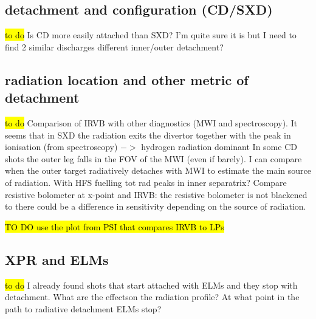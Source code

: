 \subsection{detachment and configuration (CD/SXD)}
\hl{to do}
Is CD more easily attached than SXD? I'm quite sure it is but I need to find 2 similar discharges
different inner/outer detachment?
\subsection{radiation location and other metric of detachment}
\hl{to do}
Comparison of IRVB with other diagnostics (MWI and spectroscopy). It seems that in SXD the radiation exits the divertor together with the peak in ionisation (from spectroscopy) $->$ hydrogen radiation dominant
In some CD shots the outer leg falls in the FOV of the MWI (even if barely). I can compare when the outer target radiatively detaches with MWI to estimate the main source of radiation.
With HFS fuelling tot rad peaks in inner separatrix?
Compare resistive bolometer at x-point and IRVB: the resistive bolometer is not blackened to there could be a difference in sensitivity depending on the source of radiation.

\hl{TO DO use the plot from PSI that compares IRVB to LPs}

\subsection{XPR and ELMs}
\hl{to do}
I already found shots that start attached with ELMs and they stop with detachment. What are the effectson the radiation profile? At what point in the path to radiative detachment ELMs stop?

